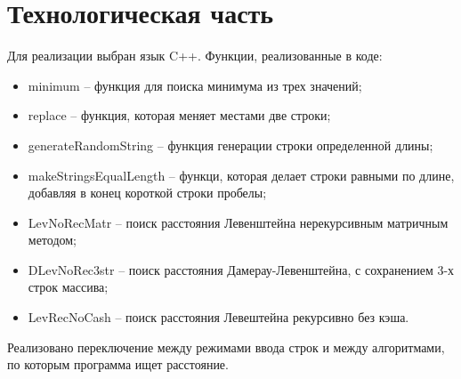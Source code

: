 \documentclass[12pt, a4paper]{article}
\begin{document}
\section{Технологическая часть}
Для реализации выбран язык C++.
Функции, реализованные в коде:
\begin{itemize}
  \item minimum -- функция для поиска минимума из 
  трех значений;
  \item replace -- функция, которая меняет местами 
  две строки;
  \item generateRandomString -- функция генерации 
  строки определенной длины;
  \item makeStringsEqualLength -- функци, которая 
  делает строки равными по длине, добавляя в 
  конец короткой строки пробелы;
  \item LevNoRecMatr -- поиск расстояния Левенштейна 
  нерекурсивным матричным методом;
  \item DLevNoRec3str -- поиск расстояния  
  Дамерау-Левенштейна, с сохранением 3-х 
  строк массива;
  \item LevRecNoCash -- поиск расстояния Левештейна 
  рекурсивно без кэша.
\end{itemize}
Реализовано переключение между режимами ввода строк 
и между алгоритмами, по которым программа ищет 
расстояние.
\end{document}
